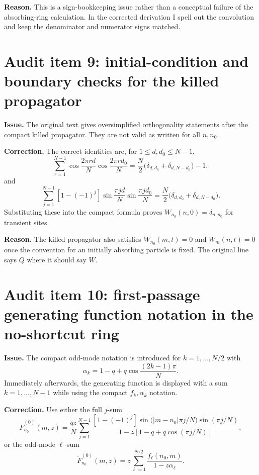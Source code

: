 \documentclass[11pt]{article}
\newcommand{\wt}{\widetilde}
\newcommand{\Issue}[1]{\par\medskip\noindent\textbf{Issue.} #1\par}
\newcommand{\Fix}[1]{\par\noindent\textbf{Correction.} #1\par}
\newcommand{\Reason}[1]{\par\noindent\textbf{Reason.} #1\par\medskip}
\begin{document}
\Reason{This is a sign-bookkeeping issue rather than a conceptual failure of the absorbing-ring
calculation.  In the corrected derivation I spell out the convolution and keep the denominator and
numerator signs matched.}

\section{Audit item 9: initial-condition and boundary checks for the killed propagator}

\Issue{The original text gives oversimplified orthogonality statements after the compact killed
propagator.  They are not valid as written for all $n,n_0$.}

\Fix{The correct identities are, for $1\le d,d_0\le N-1$,
\begin{equation}
  \sum_{r=1}^{N-1}\cos\frac{2\pi rd}{N}\cos\frac{2\pi rd_0}{N}
  =\frac{N}{2}\bigl(\delta_{d,d_0}+\delta_{d,N-d_0}\bigr)-1,
\end{equation}
and
\begin{equation}
  \sum_{j=1}^{N-1}[1-(-1)^j]\sin\frac{\pi jd}{N}\sin\frac{\pi jd_0}{N}
  =\frac{N}{2}\bigl(\delta_{d,d_0}+\delta_{d,N-d_0}\bigr).
\end{equation}
Substituting these into the compact formula proves $W_{n_0}(n,0)=\delta_{n,n_0}$ for transient
sites.}

\Reason{The killed propagator also satisfies $W_{n_0}(m,t)=0$ and $W_m(n,t)=0$ once the convention
for an initially absorbing particle is fixed.  The original line says $Q$ where it should say $W$.}

\section{Audit item 10: first-passage generating function notation in the no-shortcut ring}

\Issue{The compact odd-mode notation is introduced for $k=1,
\ldots,N/2$ with
\begin{equation}
  \alpha_k=1-q+q\cos\frac{(2k-1)\pi}{N}.
\end{equation}
Immediately afterwards, the generating function is displayed with a sum $k=1,\ldots,N-1$ while
using the compact $f_k,\alpha_k$ notation.}

\Fix{Use either the full $j$-sum
\begin{equation}
  \wt F^{(0)}_{n_0}(m,z)=
  \frac{qz}{N}\sum_{j=1}^{N-1}
  \frac{[1-(-1)^j]\sin\bigl(|m-n_0|\pi j/N\bigr)\sin(\pi j/N)}
  {1-z[1-q+q\cos(\pi j/N)]},
\end{equation}
or the odd-mode $\ell$-sum
\begin{equation}
  \wt F^{(0)}_{n_0}(m,z)=z\sum_{\ell=1}^{N/2}
  \frac{f_\ell(n_0,m)}{1-z\alpha_\ell}.
\end{equation}}
\end{document}
